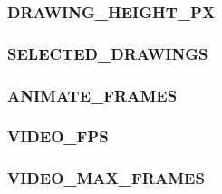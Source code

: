 \subsubsection{DRAWING\_HEIGHT\_PX}

\subsubsection{SELECTED\_DRAWINGS}

\subsubsection{ANIMATE\_FRAMES}

\subsubsection{VIDEO\_FPS}

\subsubsection{VIDEO\_MAX\_FRAMES}
